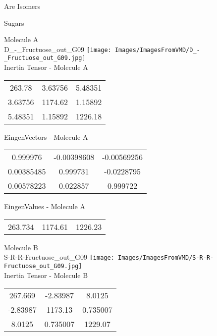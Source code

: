 \begin{center}
\vtab
\vtab
\textcolor{NavyBlue}{\Large Are Isomers}
\end{center}
\newpage

\vtab[-2cm]
\begin{center}
{\large Sugars}
\end{center}
\begin{multicols}{2}
\begin{center}
Molecule A \\ 
D\_-\_Fructuose\_out\_G09
\texttt{[image: Images/ImagesFromVMD/D\_-\_Fructuose\_out\_G09.jpg]}
\\
Inertia Tensor - Molecule A \\
\vtab
\begin{tabular}{|c c c|}
263.78	 & 	3.63756	 & 	5.48351	 \\
3.63756	 & 	1174.62	 & 	1.15892	 \\
5.48351	 & 	1.15892	 & 	1226.18
\end{tabular}

\vtab
 EingenVectors - Molecule A     \\
\vtab
\begin{tabular}{|c c c|}
0.999976	 & 	-0.00398608	 & 	-0.00569256	 \\
0.00385485	 & 	0.999731	 & 	-0.0228795	 \\
0.00578223	 & 	0.022857	 & 	0.999722
\end{tabular}

\vtab
 EingenValues - Molecule A     \\
\vtab
\begin{tabular}{|c c c|}
263.734	 & 	1174.61	 & 	1226.23
\end{tabular}
\columnbreak

Molecule B \\ 
S-R-R-Fructuose\_out\_G09
\texttt{[image: Images/ImagesFromVMD/S-R-R-Fructuose\_out\_G09.jpg]}
\\
Inertia Tensor - Molecule B \\
\vtab
\begin{tabular}{|c c c|}
267.669	 & 	-2.83987	 & 	8.0125	 \\
-2.83987	 & 	1173.13	 & 	0.735007	 \\
8.0125	 & 	0.735007	 & 	1229.07
\end{tabular}


\end{center}
\end{multicols}
